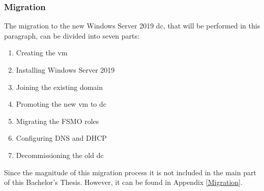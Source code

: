 \subsubsection{Migration}
The migration to the new Windows Server 2019 \acrshort{dc}, that will be performed in this paragraph, can be divided into seven parts:
\begin{enumerate}
	\item Creating the \acrshort{vm}
	\item Installing Windows Server 2019
	\item Joining the existing domain
	\item Promoting the new \acrshort{vm} to \acrshort{dc}
	\item Migrating the FSMO roles
	\item Configuring DNS and DHCP
	\item Decommissioning the old \acrshort{dc} 
\end{enumerate}
Since the magnitude of this migration process it is not included in the main part of this Bachelor's Thesis. However, it can be found in Appendix \ref{Migration}. 

